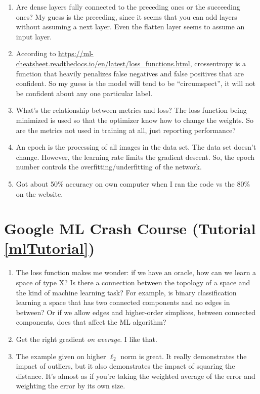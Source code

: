 \begin{enumerate}
	\item Are dense layers fully connected to the preceding ones or the
	succeeding ones? My guess is the preceding, since it seems that you can
	add layers without assuming a next layer. Even the flatten layer seems
	to assume an input layer.

	\item According to
	\url{https://ml-cheatsheet.readthedocs.io/en/latest/loss_functions.html},
	crossentropy is a function that heavily penalizes false negatives and
	false positives that are confident. So my guess is the model will tend
	to be ``circumspect'', it will not be confident about any one
	particular label. 

	\item What's the  relationship between metrics and loss? The loss
	function being minimized is used so that the optimizer know how to
	change the weights. So are the metrics not used in training at all,
	just reporting performance?

	\item An epoch is the processing of all images in the data set. The
	data set doesn't change.  However, the learning rate limits the
	gradient descent. So, the epoch number controls the
	overfitting/underfitting of the network.

	\item Got about 50\% accuracy on own computer when I ran the code vs
	the 80\% on the website.
\end{enumerate}

\section{Google ML Crash Course (Tutorial \ref{mlTutorial})}
\begin{enumerate} 

	\item The loss function makes me wonder: if we have an oracle, how can
	we learn a space of type X? Is there a connection between the topology
	of a space and the kind of machine learning task? For example, is
	binary classification learning a space that has two connected
	components and no edges in between? Or if we allow edges and
	higher-order simplices, between connected components, does that affect
	the ML algorithm?

	\item Get the right gradient \emph{on average}. I like that.

	\item The example given on higher $\ell_2$ norm is great. It really
	demonstrates the impact of outliers, but it also demonstrates the
	impact of squaring the distance. It's almost as if you're taking the
	weighted average of the error and weighting the error by its own size.

\end{enumerate}
